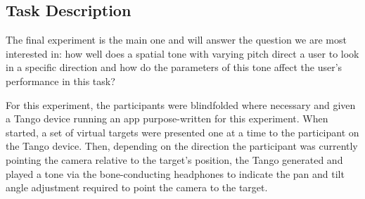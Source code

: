\documentclass[sigconf, screen=true, anonymous=true]{acmart}
\begin{document}




\subsection{Task Description}

The final experiment is the main one and will answer the question we are most interested in: how well does a spatial tone with varying pitch direct a user to look in a specific direction and how do the parameters of this tone affect the user's performance in this task? 

For this experiment, the participants were blindfolded where necessary and given a Tango device running an app purpose-written for this experiment.
When started, a set of virtual targets were presented one at a time to the participant on the Tango device.
Then, depending on the direction the participant was currently pointing the camera relative to the target's position, the Tango generated and played a tone via the bone-conducting headphones to indicate the pan and tilt angle adjustment required to point the camera to the target. %
\end{document}
